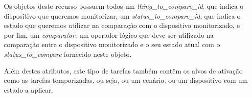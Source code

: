 Os objetos deste recurso possuem todos um \textit{thing{\_}to{\_}compare{\_}id}, que indica o dispositivo que queremos monitorizar, um \textit{status{\_}to{\_}compare{\_}id}, que indica o estado que queremos utilizar na comparação com o dispositivo monitorizado, e por fim, um \textit{comparator}, um operador lógico que deve ser utilizado na comparação entre o dispositivo monitorizado e o seu estado atual com o \textit{status{\_}to{\_}compare} fornecido neste objeto.

Além destes atributos, este tipo de tarefas também contêm os alvos de ativação como as tarefas temporizadas, ou seja, ou um cenário, ou um dispositivo com um estado a aplicar.

